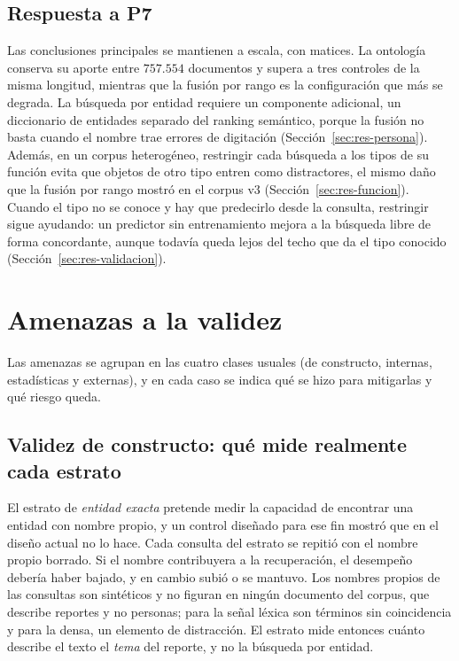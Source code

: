 \documentclass[11pt,letterpaper]{article}
\numberwithin{equation}{section}
\begin{document}
\subsection{Respuesta a P7}
\label{sec:p7}
Las conclusiones principales se mantienen a escala, con matices. La ontología conserva su aporte entre $757.554$ documentos y supera a tres controles de la misma longitud, mientras que la fusión por rango es la configuración que más se degrada. La búsqueda por entidad requiere un componente adicional, un diccionario de entidades separado del ranking semántico, porque la fusión no basta cuando el nombre trae errores de digitación (Sección~\ref{sec:res-persona}). Además, en un corpus heterogéneo, restringir cada búsqueda a los tipos de su función evita que objetos de otro tipo entren como distractores, el mismo daño que la fusión por rango mostró en el corpus v3 (Sección~\ref{sec:res-funcion}). Cuando el tipo no se conoce y hay que predecirlo desde la consulta, restringir sigue ayudando: un predictor sin entrenamiento mejora a la búsqueda libre de forma concordante, aunque todavía queda lejos del techo que da el tipo conocido (Sección~\ref{sec:res-validacion}).

\section{Amenazas a la validez}
\label{sec:validez}
Las amenazas se agrupan en las cuatro clases usuales (de constructo, internas, estadísticas y externas), y en cada caso se indica qué se hizo para mitigarlas y qué riesgo queda.

\subsection{Validez de constructo: qué mide realmente cada estrato}
\label{sec:validez-constructo}
El estrato de \emph{entidad exacta} pretende medir la capacidad de encontrar una entidad con nombre propio, y un control diseñado para ese fin mostró que en el diseño actual no lo hace. Cada consulta del estrato se repitió con el nombre propio borrado. Si el nombre contribuyera a la recuperación, el desempeño debería haber bajado, y en cambio subió o se mantuvo. Los nombres propios de las consultas son sintéticos y no figuran en ningún documento del corpus, que describe reportes y no personas; para la señal léxica son términos sin coincidencia y para la densa, un elemento de distracción. El estrato mide entonces cuánto describe el texto el \emph{tema} del reporte, y no la búsqueda por entidad.
\end{document}
